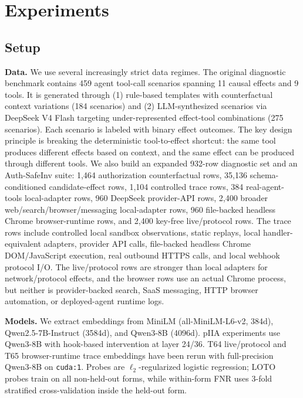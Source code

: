 \documentclass{article}
\begin{document}
\section{Experiments}

\subsection{Setup}

\textbf{Data.} We use several increasingly strict data regimes. The original diagnostic benchmark contains 459 agent tool-call scenarios spanning 11 causal effects and 9 tools. It is generated through (1) rule-based templates with counterfactual context variations (184 scenarios) and (2) LLM-synthesized scenarios via DeepSeek V4 Flash targeting under-represented effect-tool combinations (275 scenarios). Each scenario is labeled with binary effect outcomes. The key design principle is breaking the deterministic tool-to-effect shortcut: the same tool produces different effects based on context, and the same effect can be produced through different tools. We also build an expanded 932-row diagnostic set and an Auth-SafeInv suite: 1,464 authorization counterfactual rows, 35,136 schema-conditioned candidate-effect rows, 1,104 controlled trace rows, 384 real-agent-tools local-adapter rows, 960 DeepSeek provider-API rows, 2,400 broader web/search/browser/messaging local-adapter rows, 960 file-backed headless Chrome browser-runtime rows, and 2,400 key-free live/protocol rows. The trace rows include controlled local sandbox observations, static replays, local handler-equivalent adapters, provider API calls, file-backed headless Chrome DOM/JavaScript execution, real outbound HTTPS calls, and local webhook protocol I/O. The live/protocol rows are stronger than local adapters for network/protocol effects, and the browser rows use an actual Chrome process, but neither is provider-backed search, SaaS messaging, HTTP browser automation, or deployed-agent runtime logs.

\textbf{Models.} We extract embeddings from MiniLM (all-MiniLM-L6-v2, 384d), Qwen2.5-7B-Instruct (3584d), and Qwen3-8B (4096d). pIIA experiments use Qwen3-8B with hook-based intervention at layer 24/36. T64 live/protocol and T65 browser-runtime trace embeddings have been rerun with full-precision Qwen3-8B on \texttt{cuda:1}. Probes are $\ell_2$-regularized logistic regression; LOTO probes train on all non-held-out forms, while within-form FNR uses 3-fold stratified cross-validation inside the held-out form.
\end{document}
